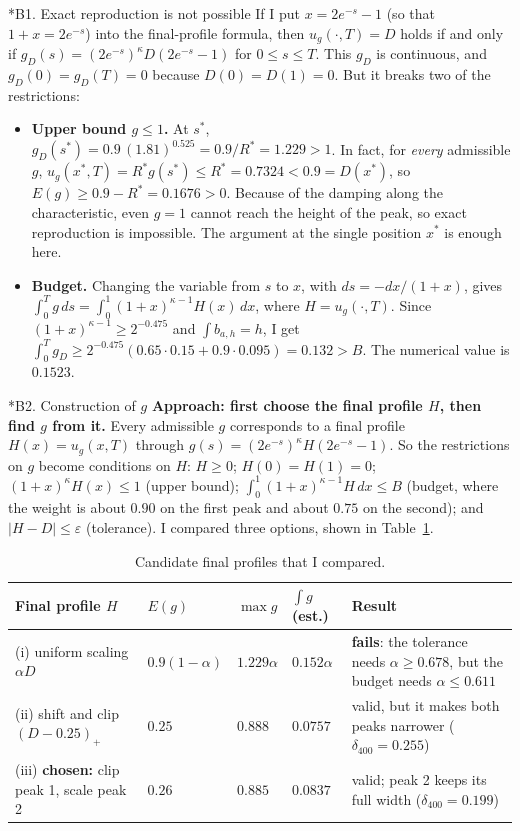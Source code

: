 \documentclass[10pt,a4paper]{article}
\makeatletter
\renewcommand\subsection{\@startsection{subsection}{2}{0pt}{4pt}{1pt}{\normalsize\bfseries}}
\newcommand{\pos}[1]{\left(#1\right)_+}
\makeatother
\begin{document}
\subsection*{B1. Exact reproduction is not possible}
If I put $x=2e^{-s}-1$ (so that $1+x=2e^{-s}$) into the final-profile formula, then $u_g(\cdot,T)=D$ holds if and only if
$g_D(s)=(2e^{-s})^{\kappa}D(2e^{-s}-1)$ for $0\le s\le T$.
This $g_D$ is continuous, and $g_D(0)=g_D(T)=0$ because $D(0)=D(1)=0$. But it breaks two of the restrictions:
\begin{itemize}
\item \textbf{Upper bound $g\le1$.} At $s^*$, $g_D(s^*)=0.9\,(1.81)^{0.525}=0.9/R^*=1.229>1$. In fact, for \emph{every} admissible $g$, $u_g(x^*,T)=R^*g(s^*)\le R^*=0.7324<0.9=D(x^*)$, so $E(g)\ge0.9-R^*=0.1676>0$. Because of the damping along the characteristic, even $g=1$ cannot reach the height of the peak, so exact reproduction is impossible. The argument at the single position $x^*$ is enough here.
\item \textbf{Budget.} Changing the variable from $s$ to $x$, with $ds=-dx/(1+x)$, gives $\int_0^Tg\,ds=\int_0^1(1+x)^{\kappa-1}H(x)\,dx$, where $H=u_g(\cdot,T)$. Since $(1+x)^{\kappa-1}\ge2^{-0.475}$ and $\int b_{a,h}=h$, I get $\int_0^Tg_D\ge2^{-0.475}(0.65\cdot0.15+0.9\cdot0.095)=0.132>B$. The numerical value is $0.1523$.
\end{itemize}

\subsection*{B2. Construction of $g$}
\textbf{Approach: first choose the final profile $H$, then find $g$ from it.} Every admissible $g$ corresponds to a final profile $H(x)=u_g(x,T)$ through $g(s)=(2e^{-s})^{\kappa}H(2e^{-s}-1)$. So the restrictions on $g$ become conditions on $H$: $H\ge0$; $H(0)=H(1)=0$; $(1+x)^{\kappa}H(x)\le1$ (upper bound); $\int_0^1(1+x)^{\kappa-1}H\,dx\le B$ (budget, where the weight is about $0.90$ on the first peak and about $0.75$ on the second); and $|H-D|\le\varepsilon$ (tolerance). I compared three options, shown in Table~\ref{tab:cand}.

\begin{table}[!htb]
\centering\small
\caption{Candidate final profiles that I compared.}
\label{tab:cand}
\begin{tabular}{@{}p{4.5cm}p{2.0cm}p{1.2cm}p{1.4cm}p{6.3cm}@{}}
\toprule
Final profile $H$ & $E(g)$ & $\max g$ & $\int g$ (est.) & Result\\\midrule
(i) uniform scaling $\alpha D$ & $0.9(1-\alpha)$ & $1.229\alpha$ & $0.152\alpha$ & \textbf{fails}: the tolerance needs $\alpha\ge0.678$, but the budget needs $\alpha\le0.611$\\
(ii) shift and clip $\pos{D-0.25}$ & $0.25$ & $0.888$ & $0.0757$ & valid, but it makes both peaks narrower ($\delta_{400}=0.255$)\\
(iii) \textbf{chosen:} clip peak 1, scale peak 2 & $0.26$ & $0.885$ & $0.0837$ & valid; peak 2 keeps its full width ($\delta_{400}=0.199$)\\\bottomrule
\end{tabular}
\end{table}
\end{document}
